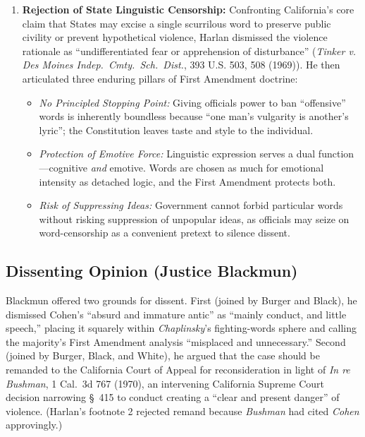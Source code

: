 \documentclass[12pt]{article}
\begin{document}
\begin{enumerate}
\begin{itemize}
  \end{itemize}
  \item \textbf{Rejection of State Linguistic Censorship:} Confronting California's core claim that States may excise a single scurrilous word to preserve public civility or prevent hypothetical violence, Harlan dismissed the violence rationale as ``undifferentiated fear or apprehension of disturbance'' (\textit{Tinker v. Des Moines Indep.\ Cmty.\ Sch.\ Dist.}, 393 U.S. 503, 508 (1969)). He then articulated three enduring pillars of First Amendment doctrine:
  \begin{itemize}
    \item \textit{No Principled Stopping Point:} Giving officials power to ban ``offensive'' words is inherently boundless because ``one man's vulgarity is another's lyric''; the Constitution leaves taste and style to the individual.
    \item \textit{Protection of Emotive Force:} Linguistic expression serves a dual function---cognitive \emph{and} emotive. Words are chosen as much for emotional intensity as detached logic, and the First Amendment protects both.
    \item \textit{Risk of Suppressing Ideas:} Government cannot forbid particular words without risking suppression of unpopular ideas, as officials may seize on word-censorship as a convenient pretext to silence dissent.
  \end{itemize}
\end{enumerate}

\subsection{Dissenting Opinion (Justice Blackmun)}

Blackmun offered two grounds for dissent. First (joined by Burger and Black), he dismissed Cohen's ``absurd and immature antic'' as ``mainly conduct, and little speech,'' placing it squarely within \textit{Chaplinsky}'s fighting-words sphere and calling the majority's First Amendment analysis ``misplaced and unnecessary.'' Second (joined by Burger, Black, and White), he argued that the case should be remanded to the California Court of Appeal for reconsideration in light of \textit{In re Bushman}, 1 Cal.\ 3d 767 (1970), an intervening California Supreme Court decision narrowing \S~415 to conduct creating a ``clear and present danger'' of violence. (Harlan's footnote 2 rejected remand because \textit{Bushman} had cited \textit{Cohen} approvingly.)
\end{document}
